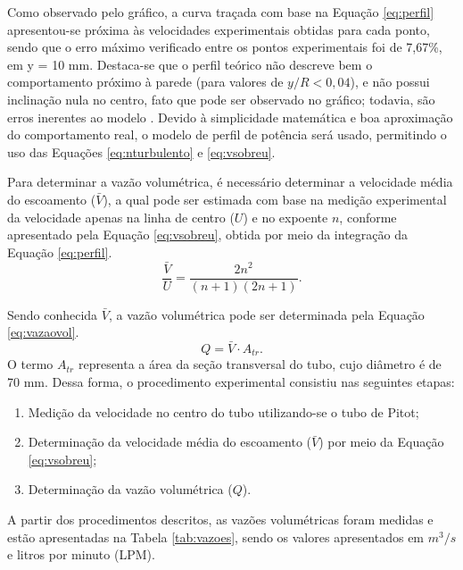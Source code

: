 Como observado pelo gráfico, a curva traçada com base na Equação \eqref{eq:perfil} apresentou-se próxima às velocidades experimentais obtidas para cada ponto, sendo que o erro máximo verificado entre os pontos experimentais foi de 7,67\%, em y = 10 mm. Destaca-se que o perfil teórico não descreve bem o comportamento próximo à parede (para valores de $y/R < 0,04$), e não possui inclinação nula no centro, fato que pode ser observado no gráfico; todavia, são erros inerentes ao modelo \cite{Fox}. Devido à simplicidade matemática e boa aproximação do comportamento real, o modelo de perfil de potência será usado, permitindo o uso das Equações \eqref{eq:nturbulento} e \eqref{eq:vsobreu}. 

Para determinar a vazão volumétrica, é necessário determinar a velocidade média do escoamento ($\bar{V}$), a qual pode ser estimada com base na medição experimental da velocidade apenas na linha de centro ($U$) e no expoente $n$, conforme apresentado pela Equação \eqref{eq:vsobreu}, obtida por meio da integração da Equação \eqref{eq:perfil}.
\begin{equation} \label{eq:vsobreu}
\frac{\bar{V}}{U} = \frac{2n^{2}}{(n+1)(2n+1)}.
\end{equation}

\noindent Sendo conhecida $\bar{V}$, a vazão volumétrica pode ser determinada pela Equação \eqref{eq:vazaovol}.
\begin{equation} \label{eq:vazaovol}
{Q} = {\bar{V}} \cdot A_{tr}.
\end{equation}
\noindent O termo $A_{tr}$ representa a área da seção transversal do tubo, cujo diâmetro é de 70
mm. Dessa forma, o procedimento experimental consistiu nas seguintes etapas:




\begin{enumerate}[noitemsep,nosep,labelindent=\parindent,leftmargin=*,label={\alph*}) ] 
	\item Medição da velocidade no centro do tubo utilizando-se o tubo de Pitot;
	\item Determinação da velocidade média do escoamento ($\bar{V}$) por meio da Equação \eqref{eq:vsobreu};
	\item Determinação da vazão volumétrica ($Q$).
\end{enumerate}

A partir dos procedimentos descritos, as vazões volumétricas foram medidas e estão apresentadas na Tabela \ref{tab:vazoes}, sendo os valores apresentados em $m^3/s$ e litros por minuto (LPM).

